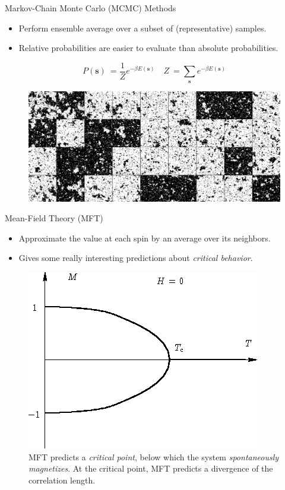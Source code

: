 \documentclass{beamer}
\newcommand{\bolds}[1]{\boldsymbol{#1}}
\newcommand{\bs}{\bolds{s}}
\renewcommand{\b}{\beta}
\begin{document}
%
\begin{frame}{Markov-Chain Monte Carlo (MCMC) Methods}
  \begin{itemize}
  \item Perform ensemble average over a subset of (representative)
    samples.
  \item Relative probabilities are easier to evaluate than absolute
    probabilities.
  \end{itemize}

   \begin{equation}%
     \boxed{P(\bs)\:=\frac{1}{Z}e^{-\b E(\bs)}\quad Z\:=\sum_{\bs} e^{-\b E(\bs)}}
   \end{equation}%

\begin{figure}[ht]
  \centering \includegraphics[width=\textwidth]{figures/samples.png}
\end{figure}

\end{frame}

\begin{frame}{Mean-Field Theory (MFT)}
  \begin{itemize}
  \item Approximate the value at each spin by an average over its
    neighbors.
  \item Gives some really interesting predictions about
    \textit{critical behavior}.
  \end{itemize}

\begin{figure}[ht]
  \centering
  \includegraphics[width=.5\textwidth]{figures/correlation-length.png}
  \caption{MFT predicts a \textit{critical point}, below which the
    system \textit{spontaneously magnetizes}. At the critical point,
    MFT predicts a divergence of the correlation length.}
\end{figure}
\end{frame}
\end{document}
